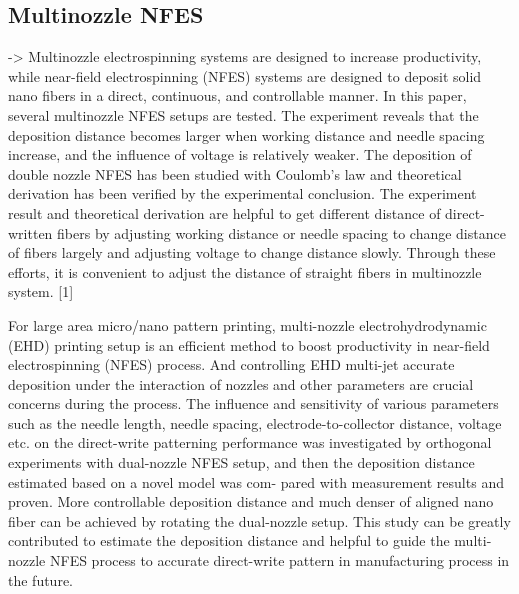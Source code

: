 \documentclass[5p,,preprint,12pt,twocolumn]{elsarticle}
\begin{document}
\subsection{Multinozzle NFES \unskip~\protect\cite{527120:11974322,527120:11974323,527120:11974324}}-{\textgreater} Multinozzle electrospinning systems are designed to increase productivity, while near-field electrospinning (NFES) systems are designed to deposit solid nano fibers in a direct, continuous, and controllable manner. In this paper, several multinozzle NFES setups are tested. The experiment reveals that the deposition distance becomes larger when working distance and needle spacing increase, and the influence of voltage is relatively weaker. The deposition of double nozzle NFES has been studied with Coulomb's law and theoretical derivation has been verified by the experimental conclusion. The experiment result and theoretical derivation are helpful to get different distance of direct-written fibers by adjusting working distance or needle spacing to change distance of fibers largely and adjusting voltage to change distance slowly. Through these efforts, it is convenient to adjust the distance of straight fibers in multinozzle system. [1]

For large area micro/nano pattern printing, multi-nozzle electrohydrodynamic (EHD) printing setup is an efficient method to boost productivity in near-field electrospinning (NFES) process. And controlling EHD multi-jet accurate deposition under the interaction of nozzles and other parameters are crucial concerns during the process. The influence and sensitivity of various parameters such as the needle length, needle spacing, electrode-to-collector distance, voltage etc. on the direct-write patterning performance was investigated by orthogonal experiments with dual-nozzle NFES setup, and then the deposition distance estimated based on a novel model was com- pared with measurement results and proven. More controllable deposition distance and much denser of aligned nano fiber can be achieved by rotating the dual-nozzle setup. This study can be greatly contributed to estimate the deposition distance and helpful to guide the multi-nozzle NFES process to accurate direct-write pattern in manufacturing process in the future.
\end{document}
